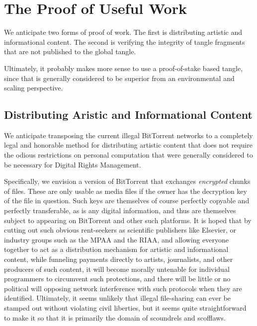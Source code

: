 \documentclass{article}
\begin{document}
\section{The Proof of Useful Work}

We anticipate two forms of proof of work. The first is distributing
artistic and informational content. The second is verifying the
integrity of tangle fragments that are not published to the global
tangle.

Ultimately, it probably makes more sense to use a proof-of-stake based
tangle, since that is generally considered to be superior from an
environmental and scaling perspective.

\subsection{Distributing Aristic and Informational Content}

We anticipate transposing the current illegal BitTorrent networks to a
completely legal and honorable method for distributing artistic
content that does not require the odious restrictions on personal
computation that were generally considered to be necessary for Digital
Rights Management.

Specifically, we envision a version of BitTorrent that exchanges {\em
  encrypted} chunks of files. These are only usable as media files if
the owner has the decryption key of the file in question. Such keys
are themselves of course perfectly copyable and perfectly
transferable, as is any digital information, and thus are themselves
subject to appearing on BitTorrent and other such platforms. It is
hoped that by cutting out such obvious rent-seekers as scientific
publishers like Elsevier, or industry groups such as the MPAA and the
RIAA, and allowing everyone together to act as a distribution
mechanism for artistic and informational content, while funneling
payments directly to artists, journalists, and other producers of such
content, it will become morally untenable for individual programmers
to circumvent such protections, and there will be little or no
political will opposing network interference with such protocols when
they are identified. Ultimately, it seems unlikely that illegal
file-sharing can ever be stamped out without violating civil
liberties, but it seems quite straightforward to make it so that it is
primarily the domain of scoundrels and scofflaws.
\end{document}

